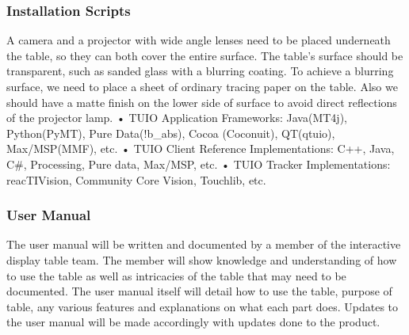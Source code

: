 \subsubsection{Installation Scripts}
A camera and a projector with wide angle lenses need to be placed underneath the table, so they can both cover the entire surface. The table's surface should be transparent, such as sanded glass with a blurring coating. To achieve a blurring surface, we need to place a sheet of ordinary tracing paper on the table. Also we should have a matte finish on the lower side of surface to avoid direct reflections of the projector lamp. 
    • TUIO Application Frameworks: Java(MT4j), Python(PyMT), Pure Data(!b_abs), Cocoa (Coconuit), QT(qtuio), Max/MSP(MMF), etc. 
    • TUIO Client Reference Implementations: C++, Java, C#, Processing, Pure data, Max/MSP, etc.
    • TUIO Tracker Implementations: reacTIVision, Community Core Vision, Touchlib, etc.
    
\subsubsection{User Manual}
The user manual will be written and documented by a member of the interactive display table team. The member will show knowledge and understanding of how to use the table as well as intricacies of the table that may need to be documented. The user manual itself will detail how to use the table, purpose of table, any various features and explanations on what each part does. Updates to the user manual will be made accordingly with updates done to the product. 
